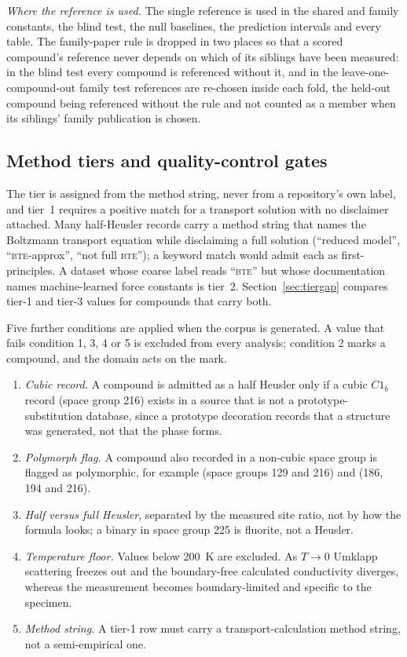 \documentclass[preprint, 12pt]{elsarticle}
\begin{document}
\emph{Where the reference is used.} The single reference is used in the shared and family constants,
the blind test, the null baselines, the prediction intervals and every table. The family-paper rule
is dropped in two places so that a scored compound's reference never depends on which of its
siblings have been measured: in the blind test every compound is referenced without it, and in the
leave-one-compound-out family test references are re-chosen inside each fold, the held-out compound
being referenced without the rule and not counted as a member when its siblings' family publication
is chosen.

\subsection*{Method tiers and quality-control gates}

The tier is assigned from the method string, never from a repository's own label, and tier~1 requires
a positive match for a transport solution with no disclaimer attached. Many half-Heusler records
carry a method string that names the Boltzmann transport equation while disclaiming a full solution
(``reduced model'', ``\textsc{bte}-approx'', ``not full \textsc{bte}''); a keyword match would admit
each as first-principles. A dataset whose coarse label reads ``\textsc{bte}'' but whose documentation
names machine-learned force constants is tier~2. Section~\ref{sec:tiergap} compares tier-1 and tier-3
values for compounds that carry both.

Five further conditions are applied when the corpus is generated. A value that fails condition 1, 3,
4 or 5 is excluded from every analysis; condition 2 marks a compound, and the domain acts on the mark.
\begin{enumerate}
  \item \emph{Cubic record.} A compound is admitted as a half Heusler only if a cubic $C1_b$ record
        (space group 216) exists in a source that is not a prototype-substitution database, since a
        prototype decoration records that a structure was generated, not that the phase forms.
  \item \emph{Polymorph flag.} A compound also recorded in a non-cubic space group is flagged as
        polymorphic, for example  (space groups 129 and 216) and  (186, 194 and
        216).
  \item \emph{Half versus full Heusler,} separated by the measured site ratio, not by how the formula
        looks; a binary in space group 225 is fluorite, not a Heusler.
  \item \emph{Temperature floor.} Values below \SI{200}{\kelvin} are excluded. As $T\to 0$ Umklapp
        scattering freezes out and the boundary-free calculated conductivity diverges, whereas the
        measurement becomes boundary-limited and specific to the specimen.
  \item \emph{Method string.} A tier-1 row must carry a transport-calculation method string, not a
        semi-empirical one.
\end{enumerate}
\end{document}
